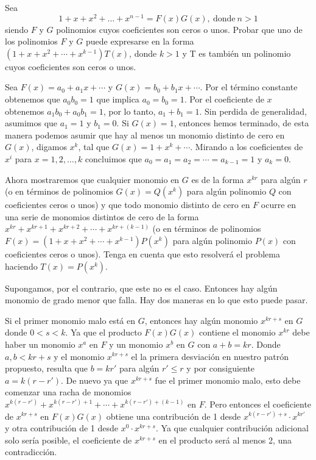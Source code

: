 \begin{example}
    Sea
    \[
        1 + x + x^2 + \ldots + x^{n - 1} = F(x) G(x),\ \text{donde}\ n > 1
    \]
    siendo $F$ y $G$ polinomios cuyos coeficientes son ceros o unos.
    Probar que uno de los polinomios $F$ y $G$ puede expresarse en la forma $(1 + x + x^2 + \cdots + x^{k - 1})T(x)$, donde $k > 1$ y T es también un polinomio cuyos coeficientes son ceros o unos.
\end{example}
\begin{solution}
    Sea $F(x) = a_0 + a_1 x + \cdots$ y $G(x) = b_0 + b_1 x + \cdots$.
    Por el término constante obtenemos que $a_0 b_0 = 1$ que implica $a_0 = b_0 = 1$.
    Por el coeficiente de $x$ obtenemos $a_1 b_0 + a_0 b_1 = 1$, por lo tanto, $a_1 + b_1 = 1$.
    Sin perdida de generalidad, asumimos que $a_1 = 1$ y $b_1 = 0$.
    Si $G(x) = 1$, entonces hemos terminado, de esta manera podemos asumir que hay al menos un monomio distinto de cero en $G(x)$, digamos $x^k$, tal que $G(x) = 1 + x^k + \cdots$.
    Mirando a los coeficientes de $x^i$ para $x = 1, 2,\ldots, k$ concluimos que $a_0 = a_1 = a_2 = \cdots = a_{k - 1} = 1$ y $a_k = 0$.

    Ahora mostraremos que cualquier monomio en $G$ es de la forma $x^{kr}$ para algún $r$ (o en términos de polinomios $G(x) = Q(x^k)$ para algún polinomio $Q$ con coeficientes ceros o unos) y que todo monomio distinto de cero en $F$ ocurre en una serie de monomios distintos de cero de la forma $x^{kr} + x^{kr + 1} + x^{kr + 2} + \cdots + x^{kr + (k - 1)}$ (o en términos de polinomios $F(x) = (1 + x + x^2 + \cdots + x^{k - 1}) P(x^k)$ para algún polinomio $P(x)$ con coeficientes ceros o unos).
    Tenga en cuenta que esto resolverá el problema haciendo $T(x) = P(x^k)$.

    Supongamos, por el contrario, que este no es el caso.
    Entonces hay algún monomio de grado menor que falla.
    Hay dos maneras en lo que esto puede pasar.

    Si el primer monomio malo está en $G$, entonces hay algún monomio $x^{kr + s}$ en $G$ donde $0 < s < k$.
    Ya que el producto $F(x) G(x)$ contiene el monomio $x^{kr}$ debe haber un monomio $x^a$ en $F$ y un monomio $x^b$ en $G$ con $a + b = kr$.
    Donde $a,b < kr + s$ y el monomio $x^{kr + s}$ el la primera desviación en nuestro patrón propuesto, resulta que $b = k r'$ para algún $r'\leq r$ y por consiguiente $a = k(r - r')$.
    De nuevo ya que $x^{kr + s}$ fue el primer monomio malo, esto debe comenzar una racha de monomios $x^{k(r - r')} + x^{k(r - r') + 1} + \cdots + x^{k(r - r') + (k - 1)}$ en $F$.
    Pero entonces el coeficiente de $x^{kr + s}$ en $F(x) G(x)$ obtiene una contribución de 1 desde $x^{k(r - r') + s} \cdot x^{kr'}$ y otra contribución de 1 desde $x^0 \cdot x^{kr + s}$.
    Ya que cualquier contribución adicional solo sería posible, el coeficiente de $x^{kr + s}$ en el producto será al menos 2, una contradicción.


\end{solution}
